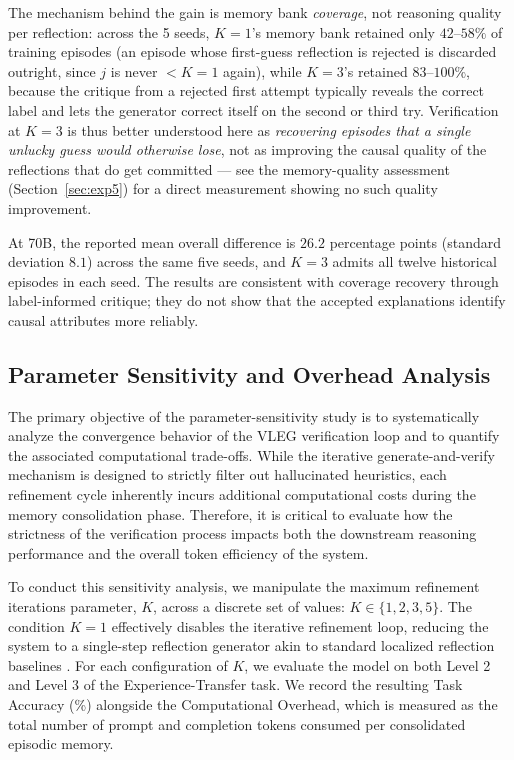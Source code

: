 The mechanism behind the gain is memory bank \emph{coverage}, not reasoning quality per reflection: across the 5 seeds, $K=1$'s memory bank retained only $42$--$58\%$ of training episodes (an episode whose first-guess reflection is rejected is discarded outright, since $j$ is never $<K{=}1$ again), while $K=3$'s retained $83$--$100\%$, because the critique from a rejected first attempt typically reveals the correct label and lets the generator correct itself on the second or third try. Verification at $K=3$ is thus better understood here as \emph{recovering episodes that a single unlucky guess would otherwise lose}, not as improving the causal quality of the reflections that do get committed --- see the memory-quality assessment (Section~\ref{sec:exp5}) for a direct measurement showing no such quality improvement.

At 70B, the reported mean overall difference is $26.2$ percentage points (standard deviation $8.1$) across the same five seeds, and $K=3$ admits all twelve historical episodes in each seed. The results are consistent with coverage recovery through label-informed critique; they do not show that the accepted explanations identify causal attributes more reliably.


\subsection{Parameter Sensitivity and Overhead Analysis}
\label{sec:exp4}

The primary objective of the parameter-sensitivity study is to systematically analyze the convergence behavior of the VLEG verification loop and to quantify the associated computational trade-offs. While the iterative generate-and-verify mechanism is designed to strictly filter out hallucinated heuristics, each refinement cycle inherently incurs additional computational costs during the memory consolidation phase. Therefore, it is critical to evaluate how the strictness of the verification process impacts both the downstream reasoning performance and the overall token efficiency of the system.

To conduct this sensitivity analysis, we manipulate the maximum refinement iterations parameter, $K$, across a discrete set of values: $K \in \{1, 2, 3, 5\}$. The condition $K=1$ effectively disables the iterative refinement loop, reducing the system to a single-step reflection generator akin to standard localized reflection baselines \cite{shinn2023reflexion}. For each configuration of $K$, we evaluate the model on both Level 2 and Level 3 of the Experience-Transfer task. We record the resulting Task Accuracy (\%) alongside the Computational Overhead, which is measured as the total number of prompt and completion tokens consumed per consolidated episodic memory.

